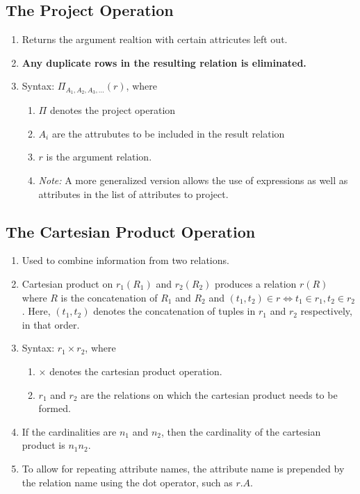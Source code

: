 \documentclass[journal,12pt,twocolumn]{IEEEtran}
\begin{document}
\subsection{The Project Operation}
\begin{enumerate}
    \item Returns the argument realtion with certain attricutes left out.
    \item \textbf{Any duplicate rows in the resulting relation is eliminated.}
    \item Syntax: $\Pi_{A_1, A_2, A_3, \ldots}(r)$, where
    \begin{enumerate}
        \item $\Pi$ denotes the project operation
        \item $A_i$ are the attrubutes to be included in the result relation
        \item $r$ is the argument relation.
        \item \textit{Note:} A more generalized version allows the use of 
        expressions as well as attributes in the list of attributes to project.
    \end{enumerate}
\end{enumerate}

\subsection{The Cartesian Product Operation}
\begin{enumerate}
    \item Used to combine information from two relations.
    \item Cartesian product on $r_1(R_1)$ and $r_2(R_2)$ produces a relation 
    $r(R)$ where $R$ is the concatenation of $R_1$ and $R_2$ and $(t_1, t_2) 
    \in r \iff t_1 \in r_1, t_2 \in r_2$. Here, $(t_1, t_2)$ denotes the 
    concatenation of tuples in $r_1$ and $r_2$ respectively, in that order.
    \item Syntax: $r_1 \times r_2$, where
    \begin{enumerate}
        \item $\times$ denotes the cartesian product operation.
        \item $r_1$ and $r_2$ are the relations on which the cartesian product 
        needs to be formed.
    \end{enumerate}
    \item If the cardinalities are $n_1$ and $n_2$, then the cardinality of the
    cartesian product is $n_1n_2$.
    \item To allow for repeating attribute names, the attribute name is 
    prepended by the relation name using the dot operator, such as $r.A$.
\end{enumerate}
\end{document}
